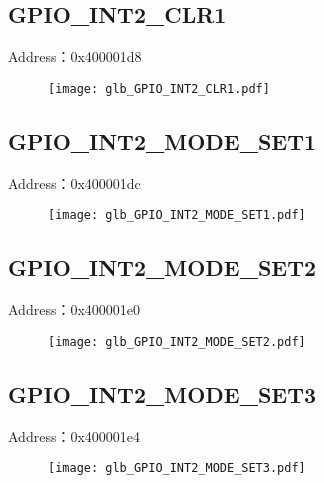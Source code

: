 \subsection{GPIO\_INT2\_CLR1}
\label{glb-GPIO-INT2-CLR1}
Address：0x400001d8
 \begin{figure}[H]
\texttt{[image: glb\_GPIO\_INT2\_CLR1.pdf]}
\end{figure}

\subsection{GPIO\_INT2\_MODE\_SET1}
\label{glb-GPIO-INT2-MODE-SET1}
Address：0x400001dc
 \begin{figure}[H]
\texttt{[image: glb\_GPIO\_INT2\_MODE\_SET1.pdf]}
\end{figure}

\subsection{GPIO\_INT2\_MODE\_SET2}
\label{glb-GPIO-INT2-MODE-SET2}
Address：0x400001e0
 \begin{figure}[H]
\texttt{[image: glb\_GPIO\_INT2\_MODE\_SET2.pdf]}
\end{figure}

\subsection{GPIO\_INT2\_MODE\_SET3}
\label{glb-GPIO-INT2-MODE-SET3}
Address：0x400001e4
 \begin{figure}[H]
\texttt{[image: glb\_GPIO\_INT2\_MODE\_SET3.pdf]}
\end{figure}

